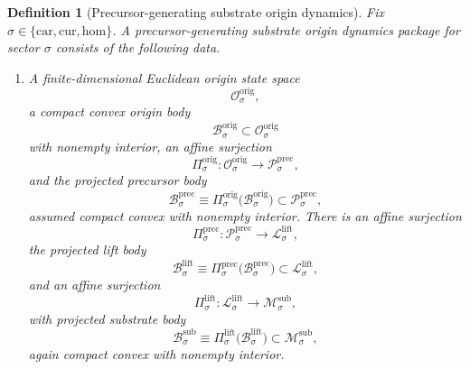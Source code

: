 \documentclass[11pt]{article}
\newcommand{\Car}{\mathrm{car}}
\newcommand{\Cur}{\mathrm{cur}}
\newcommand{\Hom}{\mathrm{hom}}
\newcommand{\SubSpace}[1]{\mathcal M_{#1}^{\mathrm{sub}}}
\newcommand{\SubBody}[1]{\mathcal B_{#1}^{\mathrm{sub}}}
\newcommand{\LiftSpace}[1]{\mathcal L_{#1}^{\mathrm{lift}}}
\newcommand{\LiftBody}[1]{\mathcal B_{#1}^{\mathrm{lift}}}
\newcommand{\LiftProj}[1]{\Pi_{#1}^{\mathrm{lift}}}
\newcommand{\PrecSpace}[1]{\mathcal P_{#1}^{\mathrm{prec}}}
\newcommand{\PrecBody}[1]{\mathcal B_{#1}^{\mathrm{prec}}}
\newcommand{\PrecProj}[1]{\Pi_{#1}^{\mathrm{prec}}}
\newcommand{\OrigSpace}[1]{\mathcal O_{#1}^{\mathrm{orig}}}
\newcommand{\OrigBody}[1]{\mathcal B_{#1}^{\mathrm{orig}}}
\newcommand{\OrigProj}[1]{\Pi_{#1}^{\mathrm{orig}}}
\newtheorem{definition}{Definition}
\begin{document}
\begin{definition}[Precursor-generating substrate origin dynamics]
\label{def:orig}
Fix \(\sigma\in\{\Car,\Cur,\Hom\}\). A \emph{precursor-generating substrate origin dynamics package} for sector \(\sigma\) consists of the following data.
\begin{enumerate}
    \item A finite-dimensional Euclidean origin state space
    \[
    \OrigSpace{\sigma},
    \]
    a compact convex origin body
    \[
    \OrigBody{\sigma}\subset\OrigSpace{\sigma}
    \]
    with nonempty interior, an affine surjection
    \[
    \OrigProj{\sigma}:\OrigSpace{\sigma}\to\PrecSpace{\sigma},
    \]
    and the projected precursor body
    \[
    \PrecBody{\sigma}
    \equiv
    \OrigProj{\sigma}\bigl(\OrigBody{\sigma}\bigr)
    \subset\PrecSpace{\sigma},
    \]
    assumed compact convex with nonempty interior. There is an affine surjection
    \[
    \PrecProj{\sigma}:\PrecSpace{\sigma}\to\LiftSpace{\sigma},
    \]
    the projected lift body
    \[
    \LiftBody{\sigma}
    \equiv
    \PrecProj{\sigma}\bigl(\PrecBody{\sigma}\bigr)
    \subset\LiftSpace{\sigma},
    \]
    and an affine surjection
    \[
    \LiftProj{\sigma}:\LiftSpace{\sigma}\to\SubSpace{\sigma},
    \]
    with projected substrate body
    \[
    \SubBody{\sigma}
    \equiv
    \LiftProj{\sigma}\bigl(\LiftBody{\sigma}\bigr)
    \subset\SubSpace{\sigma},
    \]
    again compact convex with nonempty interior.


\end{enumerate}
\end{definition}
\end{document}
